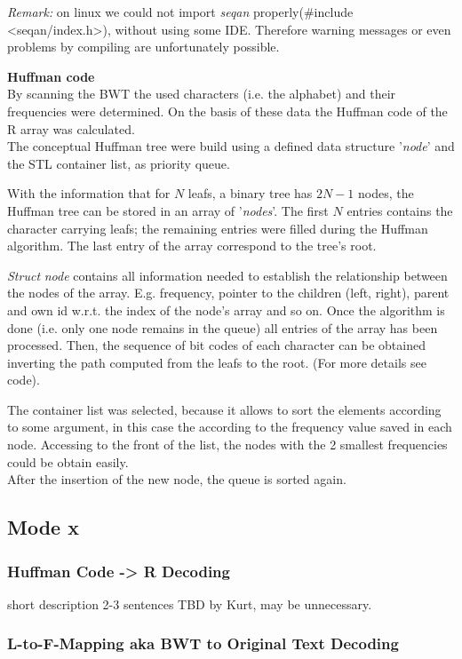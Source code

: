 \documentclass[11pt, notitlepage]{scrartcl}
\begin{document}
\emph{Remark:} on linux we could not import \textit{seqan} properly(\#include <seqan/index.h>), without using some IDE. Therefore warning messages or even problems by compiling are unfortunately possible.


\textbf{Huffman code}\\
By scanning the BWT the used characters (i.e. the alphabet) and their frequencies were determined. On the basis of these data the Huffman code of the R array was calculated.\\
The conceptual Huffman tree were build using a defined data structure '\textit{node}' and the STL container list, as priority queue.

With the information that for $N$ leafs, a binary tree has $2N-1$ nodes, the Huffman tree can be stored in an array of '\textit{nodes}'. The first $N$ entries contains the character carrying leafs; the remaining entries were filled during the Huffman algorithm. The last entry of the array correspond to the tree's root.

\textit{Struct} \textit{node} contains all information needed to establish the relationship between the nodes of the array. E.g. frequency, pointer to the children (left, right), parent and own id w.r.t. the index of the node's array and so on. Once the algorithm is done (i.e. only one node remains in the queue) all entries of the array has been processed. Then, the sequence of bit codes of each character can be obtained inverting the path computed from the leafs to the root. (For more details see code).

The container list was selected, because it allows to sort the elements according to some argument, in this case the according to the frequency value saved in each node. Accessing to the front of the list, the nodes with the 2 smallest frequencies could be obtain easily. \\
After the insertion of the new node, the queue is sorted again.

\subsection{Mode x}
\subsubsection{Huffman Code -> R Decoding}
short description 2-3 sentences TBD by Kurt, may be unnecessary.
\subsubsection{L-to-F-Mapping aka BWT to Original Text Decoding}
\end{document}
